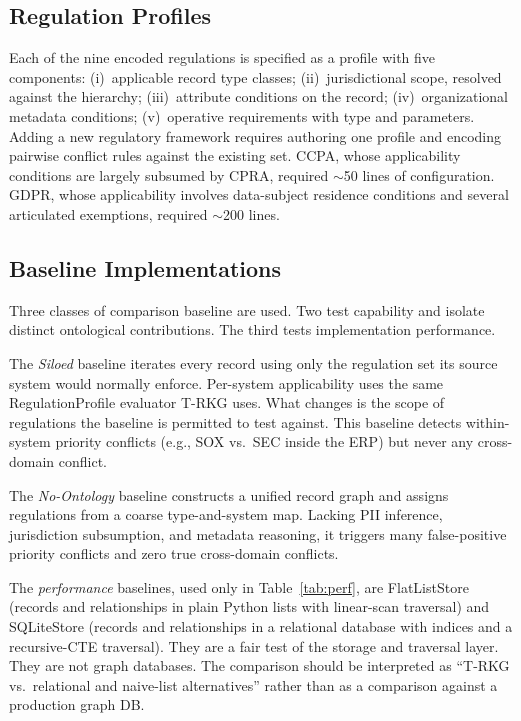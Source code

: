 \documentclass{ieeeaccess}
\begin{document}
\subsection{Regulation Profiles}

Each of the nine encoded regulations is specified as a profile with five components: (i)~applicable record type classes; (ii)~jurisdictional scope, resolved against the hierarchy; (iii)~attribute conditions on the record; (iv)~organizational metadata conditions; (v)~operative requirements with type and parameters. Adding a new regulatory framework requires authoring one profile and encoding pairwise conflict rules against the existing set. CCPA, whose applicability conditions are largely subsumed by CPRA, required $\sim$50 lines of configuration. GDPR, whose applicability involves data-subject residence conditions and several articulated exemptions, required $\sim$200 lines.

\subsection{Baseline Implementations}

Three classes of comparison baseline are used. Two test capability and isolate distinct ontological contributions. The third tests implementation performance.

The \textit{Siloed} baseline iterates every record using only the regulation set its source system would normally enforce. Per-system applicability uses the same RegulationProfile evaluator T-RKG uses. What changes is the scope of regulations the baseline is permitted to test against. This baseline detects within-system priority conflicts (e.g., SOX vs.\ SEC inside the ERP) but never any cross-domain conflict.

The \textit{No-Ontology} baseline constructs a unified record graph and assigns regulations from a coarse type-and-system map. Lacking PII inference, jurisdiction subsumption, and metadata reasoning, it triggers many false-positive priority conflicts and zero true cross-domain conflicts.

The \textit{performance} baselines, used only in Table~\ref{tab:perf}, are FlatListStore (records and relationships in plain Python lists with linear-scan traversal) and SQLiteStore (records and relationships in a relational database with indices and a recursive-CTE traversal). They are a fair test of the storage and traversal layer. They are not graph databases. The comparison should be interpreted as ``T-RKG vs.\ relational and naive-list alternatives'' rather than as a comparison against a production graph DB.
\end{document}
